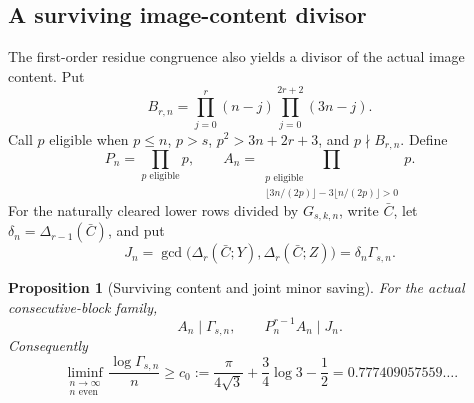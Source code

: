 \documentclass[11pt]{article}
\newtheorem{proposition}[theorem]{Proposition}
\theoremstyle{remark}
\begin{document}
\subsection{A surviving image-content divisor}
The first-order residue congruence also yields a divisor of the actual
image content. Put
\[
 B_{r,n}=\prod_{j=0}^r(n-j)\prod_{j=0}^{2r+2}(3n-j).
\]
Call \(p\) eligible when \(p\le n\), \(p>s\),
\(p^2>3n+2r+3\), and \(p\nmid B_{r,n}\). Define
\[
 P_n=\prod_{p\text{ eligible}}p,\qquad
 A_n=\prod_{\substack{p\text{ eligible}\\
 \lfloor3n/(2p)\rfloor-3\lfloor n/(2p)\rfloor>0}}p.
\]
For the naturally cleared lower rows divided by \(G_{s,k,n}\), write
\(\bar C\), let \(\delta_n=\Delta_{r-1}(\bar C)\), and put
\[
 J_n=\gcd\bigl(\Delta_r(\bar C;Y),\Delta_r(\bar C;Z)\bigr)
     =\delta_n\Gamma_{s,n}.
\]
\begin{proposition}[Surviving content and joint minor saving]
For the actual consecutive-block family,
\[
 A_n\mid\Gamma_{s,n},\qquad P_n^{r-1}A_n\mid J_n.
\]
Consequently
\begin{equation}
 \liminf_{\substack{n\to\infty\\n\text{ even}}}
 \frac{\log\Gamma_{s,n}}n\ge
 c_0:=\frac{\pi}{4\sqrt3}+\frac34\log3-\frac12
 =0.777409057559\ldots.
 \label{eq:surviving-image-rate}
\end{equation}
\end{proposition}
\end{document}
